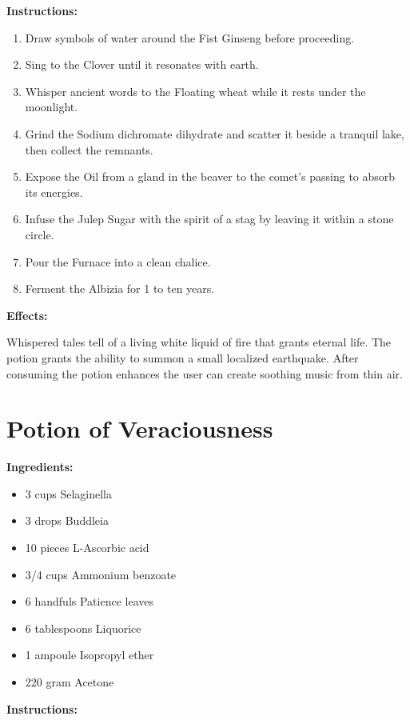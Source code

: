 \documentclass{article}
\begin{document}
\textbf{Instructions:}

\begin{enumerate}
  \item Draw symbols of water around the Fist Ginseng before proceeding.
  \item Sing to the Clover until it resonates with earth.
  \item Whisper ancient words to the Floating wheat while it rests under the moonlight.
  \item Grind the Sodium dichromate dihydrate and scatter it beside a tranquil lake, then collect the remnants.
  \item Expose the Oil from a gland in the beaver to the comet’s passing to absorb its energies.
  \item Infuse the Julep Sugar with the spirit of a stag by leaving it within a stone circle.
  \item Pour the Furnace into a clean chalice.
  \item Ferment the Albizia for 1 to ten years.
\end{enumerate}

\textbf{Effects:}

Whispered tales tell of a living white liquid of fire that grants eternal life. The potion grants the ability to summon a small localized earthquake. After consuming the potion enhances the user can create soothing music from thin air.

\newpage
\section*{Potion of Veraciousness}

\textbf{Ingredients:}

\begin{itemize}
  \item 3 cups Selaginella
  \item 3 drops Buddleia
  \item 10 pieces L-Ascorbic acid
  \item 3/4 cups Ammonium benzoate
  \item 6 handfuls Patience leaves
  \item 6 tablespoons Liquorice
  \item 1 ampoule Isopropyl ether
  \item 220 gram Acetone
\end{itemize}

\textbf{Instructions:}
\end{document}
